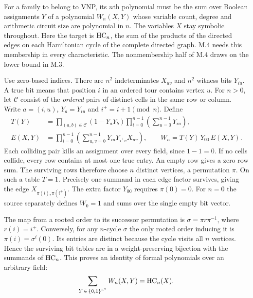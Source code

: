 \newpage
{}
\label{sec:membership}
For a family to belong to VNP, its $n$th polynomial must be the sum over Boolean assignments $Y$ of a polynomial $W_n(X,Y)$ whose variable count, degree and arithmetic circuit size are polynomial in $n$. The variables $X$ stay symbolic throughout. Here the target is $\mathrm{HC}_n$, the sum of the products of the directed edges on each Hamiltonian cycle of the complete directed graph. M.4 needs this membership in every characteristic. The nonmembership half of M.4 draws on the lower bound in M.3.

Use zero-based indices. There are $n^2$ indeterminates $X_{uv}$ and $n^2$ witness bits $Y_{iu}$. A true bit means that position $i$ in an ordered tour contains vertex $u$. For $n>0$, let $\mathcal C$ consist of the \emph{ordered} pairs of distinct cells in the same row or column. Write $a=(i,u)$, $Y_a=Y_{iu}$ and $i^+=i+1\pmod n$. Define
\begin{align*}
 T(Y)&=\prod_{(a,b)\in\mathcal C}(1-Y_aY_b)
       \prod_{i=0}^{n-1}\left(\sum_{u=0}^{n-1}Y_{iu}\right),\\
 E(X,Y)&=\prod_{i=0}^{n-1}\left(\sum_{u,v=0}^{n-1}
                  Y_{iu}Y_{i^+v}X_{uv}\right),\qquad
 W_n=T(Y)\,Y_{00}\,E(X,Y).
\end{align*}
Each colliding pair kills an assignment over every field, since $1-1=0$. If no cells collide, every row contains at most one true entry. An empty row gives a zero row sum. The surviving rows therefore choose $n$ distinct vertices, a permutation $\pi$. On such a table $T=1$. Precisely one summand in each edge factor survives, giving the edge $X_{\pi(i),\pi(i^+)}$. The extra factor $Y_{00}$ requires $\pi(0)=0$. For $n=0$ the source separately defines $W_0=1$ and sums over the single empty bit vector.

The map from a rooted order to its successor permutation is $\sigma=\pi r\pi^{-1}$, where $r(i)=i^+$. Conversely, for any $n$-cycle $\sigma$ the only rooted order inducing it is $\pi(i)=\sigma^i(0)$. Its entries are distinct because the cycle visits all $n$ vertices. Hence the surviving bit tables are in a weight-preserving bijection with the summands of $\mathrm{HC}_n$. This proves an identity of formal polynomials over an arbitrary field:
\[
                 \sum_{Y\,\in\,\{0,1\}^{n^2}} W_n(X,Y)=\mathrm{HC}_n(X).
\]


